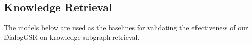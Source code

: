 
\subsection{Knowledge Retrieval}
The models below are used as the baselines for validating the effectiveness of our DialogGSR on knowledge subgraph retrieval.

